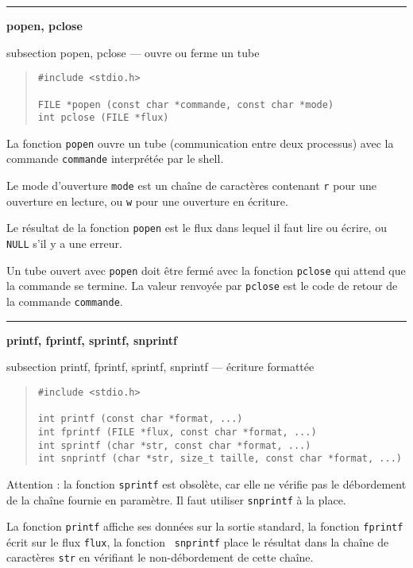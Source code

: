 \documentclass [twoside] {report}
\newcommand {\primitive} [1]
    {
	{\large \bf #1}
	\addcontentsline {toc} {subsection} {#1}
    }
\newcommand {\separation}
    {
	\vspace {7mm}
	\nopagebreak
	\hrule
    }
\begin{document}
\separation
\primitive {popen, pclose} --- ouvre ou ferme un tube

\begin {quote}
\begin {verbatim}
#include <stdio.h>

FILE *popen (const char *commande, const char *mode)
int pclose (FILE *flux)
\end{verbatim}
\end {quote}

La fonction {\tt popen} ouvre un tube (communication entre
deux processus) avec la commande {\tt commande} interprétée par
le shell.

Le mode d'ouverture {\tt mode} est un chaîne de caractères
contenant {\tt r} pour une ouverture en lecture, ou {\tt w} pour
une ouverture en écriture.

Le résultat de la fonction {\tt popen} est le flux dans lequel
il faut lire ou écrire, ou {\tt NULL} s'il y a une erreur.

Un tube ouvert avec {\tt popen} doit être fermé avec la
fonction {\tt pclose} qui attend que la commande se termine. La
valeur renvoyée par {\tt pclose} est le code de retour de la
commande {\tt commande}.



\separation
\primitive {printf, fprintf, sprintf, snprintf} --- écriture formattée

\begin {quote}
\begin {verbatim}
#include <stdio.h>

int printf (const char *format, ...)
int fprintf (FILE *flux, const char *format, ...)
int sprintf (char *str, const char *format, ...)
int snprintf (char *str, size_t taille, const char *format, ...)
\end{verbatim}
\end {quote}

Attention : la fonction \texttt {sprintf} est obsolète, car elle ne
vérifie pas le débordement de la chaîne fournie en paramètre. Il faut
utiliser \texttt {snprintf} à la place.

La fonction {\tt printf} affiche ses données sur la sortie standard, la
fonction {\tt fprintf} écrit sur le flux {\tt flux}, la fonction {\tt
snprintf} place le résultat dans la chaîne de caractères {\tt str} en
vérifiant le non-débordement de cette chaîne.
\end{document}
